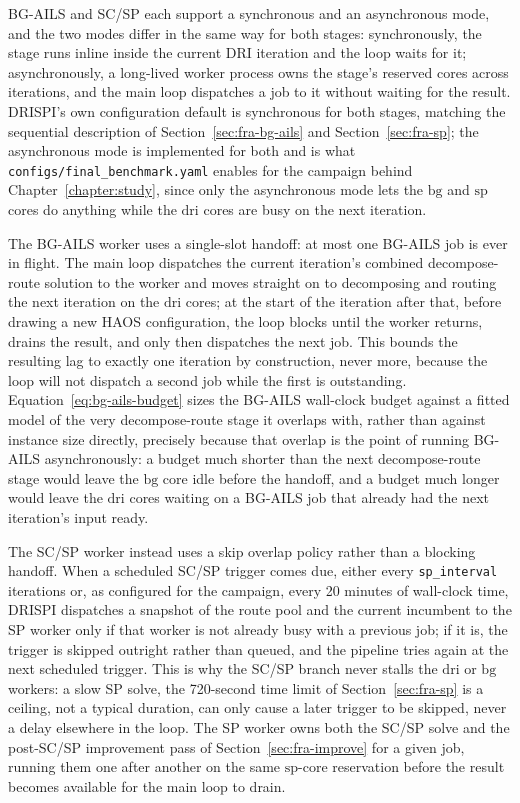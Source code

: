 BG-AILS and SC/SP each support a synchronous and an asynchronous mode, and the two modes differ in the same way for both stages: synchronously, the stage runs inline inside the current DRI iteration and the loop waits for it; asynchronously, a long-lived worker process owns the stage's reserved cores across iterations, and the main loop dispatches a job to it without waiting for the result. DRISPI's own configuration default is synchronous for both stages, matching the sequential description of Section~\ref{sec:fra-bg-ails} and Section~\ref{sec:fra-sp}; the asynchronous mode is implemented for both and is what \texttt{configs/final\_benchmark.yaml} enables for the campaign behind Chapter~\ref{chapter:study}, since only the asynchronous mode lets the $\mathrm{bg}$ and $\mathrm{sp}$ cores do anything while the $\mathrm{dri}$ cores are busy on the next iteration.

The BG-AILS worker uses a single-slot handoff: at most one BG-AILS job is ever in flight. The main loop dispatches the current iteration's combined decompose-route solution to the worker and moves straight on to decomposing and routing the next iteration on the $\mathrm{dri}$ cores; at the start of the iteration after that, before drawing a new HAOS configuration, the loop blocks until the worker returns, drains the result, and only then dispatches the next job. This bounds the resulting lag to exactly one iteration by construction, never more, because the loop will not dispatch a second job while the first is outstanding. Equation~\ref{eq:bg-ails-budget} sizes the BG-AILS wall-clock budget against a fitted model of the very decompose-route stage it overlaps with, rather than against instance size directly, precisely because that overlap is the point of running BG-AILS asynchronously: a budget much shorter than the next decompose-route stage would leave the $\mathrm{bg}$ core idle before the handoff, and a budget much longer would leave the $\mathrm{dri}$ cores waiting on a BG-AILS job that already had the next iteration's input ready.

The SC/SP worker instead uses a skip overlap policy rather than a blocking handoff. When a scheduled SC/SP trigger comes due, either every \texttt{sp\_interval} iterations or, as configured for the campaign, every 20 minutes of wall-clock time, DRISPI dispatches a snapshot of the route pool and the current incumbent to the SP worker only if that worker is not already busy with a previous job; if it is, the trigger is skipped outright rather than queued, and the pipeline tries again at the next scheduled trigger. This is why the SC/SP branch never stalls the $\mathrm{dri}$ or $\mathrm{bg}$ workers: a slow SP solve, the 720-second time limit of Section~\ref{sec:fra-sp} is a ceiling, not a typical duration, can only cause a later trigger to be skipped, never a delay elsewhere in the loop. The SP worker owns both the SC/SP solve and the post-SC/SP improvement pass of Section~\ref{sec:fra-improve} for a given job, running them one after another on the same $\mathrm{sp}$-core reservation before the result becomes available for the main loop to drain.

